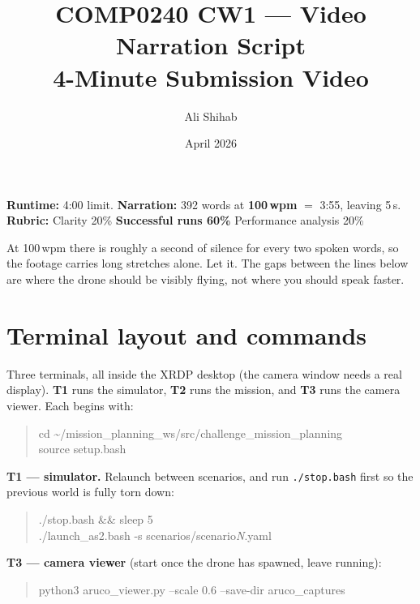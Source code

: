 \documentclass[11pt,a4paper]{article}
\title{\textbf{COMP0240 CW1 --- Video Narration Script}\\
\large 4-Minute Submission Video}
\author{Ali Shihab}
\date{April 2026}
\begin{document}
\maketitle

\noindent\textbf{Runtime:} 4:00 limit. \textbf{Narration:} 392 words at \textbf{100\,wpm} $=$ 3:55, leaving 5\,s.\\
\textbf{Rubric:} Clarity 20\% \quad \textbf{Successful runs 60\%} \quad Performance analysis 20\%

\medskip
\noindent At 100\,wpm there is roughly a second of silence for every two spoken words, so the footage carries long stretches alone. Let it. The gaps between the lines below are where the drone should be visibly flying, not where you should speak faster.

\section*{Terminal layout and commands}

Three terminals, all inside the XRDP desktop (the camera window needs a real
display). \textbf{T1} runs the simulator, \textbf{T2} runs the mission, and
\textbf{T3} runs the camera viewer. Each begins with:

\begin{quote}\ttfamily
cd \textasciitilde/mission\_planning\_ws/src/challenge\_mission\_planning\\
source setup.bash
\end{quote}

\noindent\textbf{T1 --- simulator.} Relaunch between scenarios, and run
\texttt{./stop.bash} first so the previous world is fully torn down:
\begin{quote}\ttfamily
./stop.bash \&\& sleep 5\\
./launch\_as2.bash -s scenarios/scenario\emph{N}.yaml
\end{quote}

\noindent\textbf{T3 --- camera viewer} (start once the drone has spawned, leave running):
\begin{quote}\ttfamily
python3 aruco\_viewer.py --scale 0.6 --save-dir aruco\_captures
\end{quote}
\end{document}
